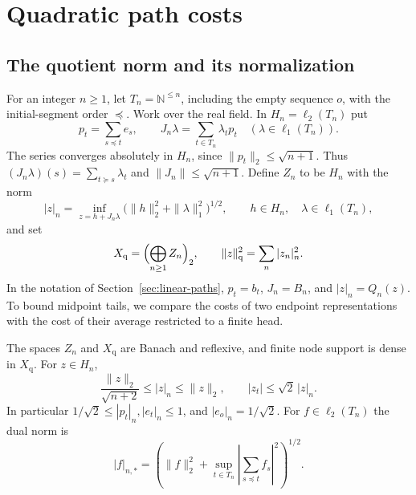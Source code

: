 \section{Quadratic path costs}\label{qp:section}

\subsection{The quotient norm and its normalization}

For an integer $n\ge1$, let $T_n=\mathbb N^{\le n}$, including the empty
sequence $o$, with the initial-segment order $\preceq$.  Work over the
real field.  In $H_n=\ell_2(T_n)$ put
\[
 p_t=\sum_{s\preceq t}e_s,\qquad
 J_n\lambda=\sum_{t\in T_n}\lambda_t p_t
       \quad(\lambda\in\ell_1(T_n)).
\]
The series converges absolutely in $H_n$, since
$\|p_t\|_2\le\sqrt{n+1}$.  Thus
$(J_n\lambda)(s)=\sum_{t\succeq s}\lambda_t$ and
$\|J_n\|\le\sqrt{n+1}$.  Define $Z_n$ to be $H_n$ with the norm
\begin{equation}\label{qp:norm}
 |z|_n=\inf_{z=h+J_n\lambda}
       \bigl(\|h\|_2^2+\|\lambda\|_1^2\bigr)^{1/2},
 \qquad h\in H_n,\quad\lambda\in\ell_1(T_n),
\end{equation}
and set
\[
 X_{\mathrm q}=\Bigl(\bigoplus_{n\ge1}Z_n\Bigr)_2,
 \qquad \|z\|_{\mathrm q}^2=\sum_n|z_n|_n^2.
\]
In the notation of Section~\ref{sec:linear-paths}, $p_t=b_t$,
$J_n=B_n$, and $|z|_n=Q_n(z)$.
To bound midpoint tails, we compare the costs of two endpoint
representations with the cost of their average restricted to a finite head.

\begin{proposition}\label{qp:construction}
The spaces $Z_n$ and $X_{\mathrm q}$ are Banach and reflexive, and finite
node support is dense in $X_{\mathrm q}$.  For $z\in H_n$,
\begin{equation}\label{qp:comparison}
 \frac{\|z\|_2}{\sqrt{n+2}}\le |z|_n\le\|z\|_2,
 \qquad |z_t|\le\sqrt2\,|z|_n.
\end{equation}
In particular $1/\sqrt2\le |p_t|_n,|e_t|_n\le1$, and
$|e_o|_n=1/\sqrt2$.  For $f\in\ell_2(T_n)$ the dual norm is
\begin{equation}\label{qp:dual}
 |f|_{n,*}=
 \left(\|f\|_2^2+
     \sup_{t\in T_n}\left|\sum_{s\preceq t}f_s\right|^2\right)^{1/2}.
\end{equation}
\end{proposition}

